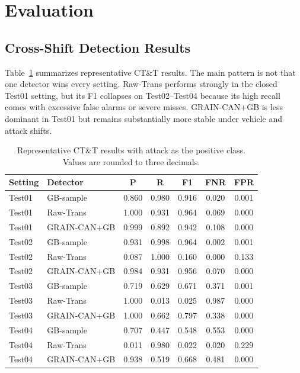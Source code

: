 \documentclass[runningheads]{llncs}
\newcommand{\method}{GRAIN-CAN}
\begin{document}
\section{Evaluation}
\subsection{Cross-Shift Detection Results}
Table~\ref{tab:main} summarizes representative CT\&T results. The main pattern is not that one detector wins every setting. Raw-Trans performs strongly in the closed Test01 setting, but its F1 collapses on Test02--Test04 because its high recall comes with excessive false alarms or severe misses. \method{}+GB is less dominant in Test01 but remains substantially more stable under vehicle and attack shifts.

\begin{table}[t]
\centering
\caption{Representative CT\&T results with attack as the positive class. Values are rounded to three decimals.}
\label{tab:main}
\small
\setlength{\tabcolsep}{4pt}
\begin{tabular}{llccccc}
\toprule
Setting & Detector & P & R & F1 & FNR & FPR \\
\midrule
Test01 & GB-sample & 0.860 & 0.980 & 0.916 & 0.020 & 0.001 \\
Test01 & Raw-Trans & 1.000 & 0.931 & 0.964 & 0.069 & 0.000 \\
Test01 & \method{}+GB & 0.999 & 0.892 & 0.942 & 0.108 & 0.000 \\
\midrule
Test02 & GB-sample & 0.931 & 0.998 & 0.964 & 0.002 & 0.001 \\
Test02 & Raw-Trans & 0.087 & 1.000 & 0.160 & 0.000 & 0.133 \\
Test02 & \method{}+GB & 0.984 & 0.931 & 0.956 & 0.070 & 0.000 \\
\midrule
Test03 & GB-sample & 0.719 & 0.629 & 0.671 & 0.371 & 0.001 \\
Test03 & Raw-Trans & 1.000 & 0.013 & 0.025 & 0.987 & 0.000 \\
Test03 & \method{}+GB & 1.000 & 0.662 & 0.797 & 0.338 & 0.000 \\
\midrule
Test04 & GB-sample & 0.707 & 0.447 & 0.548 & 0.553 & 0.000 \\
Test04 & Raw-Trans & 0.011 & 0.980 & 0.022 & 0.020 & 0.229 \\
Test04 & \method{}+GB & 0.938 & 0.519 & 0.668 & 0.481 & 0.000 \\
\bottomrule
\end{tabular}
\end{table}
\end{document}
